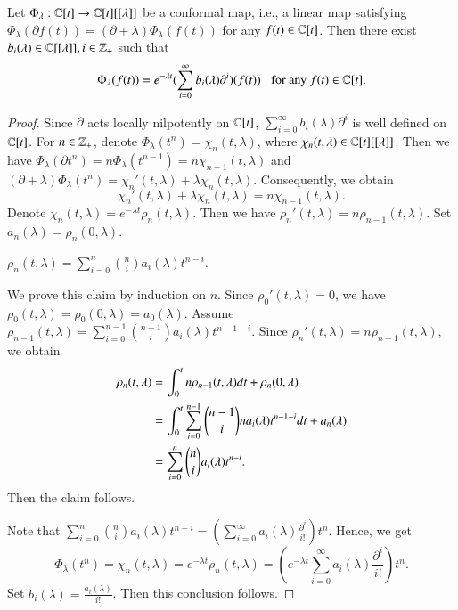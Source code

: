 \documentclass[12pt]{amsart}
\begin{document}
\begin{lem}\label{lem-conf}
Let $\Phi_\lambda: \mathbb{C}[t]\rightarrow \mathbb{C}[t][[\lambda]]$ be a conformal map, i.e., a linear
map satisfying $\Phi_\lambda(\partial f(t))=(\partial+\lambda)\Phi_\lambda(f(t))$ for any $f(t)\in\mathbb{C}[t]$.
Then there exist $b_i(\lambda)\in\mathbb{C}[[\lambda]],i\in\mathbb{Z}_+$ such that $$\Phi_\lambda(f(t))=e^{-\lambda t}(\sum_{i=0}^\infty b_i(\lambda)\partial^i)(f(t))\;\;\;\text{for any $f(t)\in\mathbb{C}[t]$}.$$
\end{lem}
\begin{proof}
Since $\partial$ acts locally nilpotently on $\mathbb{C}[t]$, $\sum_{i=0}^\infty b_i(\lambda)\partial^i$ is well defined on $\mathbb{C}[t]$.
For $n\in \mathbb{Z}_+$, denote $\Phi_\lambda(t^n)=\chi_n(t,\lambda)$, where $\chi_n(t,\lambda)\in\mathbb{C}[t][[\lambda]]$.
Then we have $\Phi_\lambda(\partial t^n)=n\Phi_\lambda(t^{n-1})=n\chi_{n-1}(t,\lambda)$ and $(\partial+\lambda)\Phi_\lambda(t^n)=\chi_n'(t,\lambda)+\lambda \chi_n(t,\lambda)$. Consequently, we obtain
$$\chi_n'(t,\lambda)+\lambda \chi_n(t,\lambda)=n\chi_{n-1}(t,\lambda).$$
Denote $\chi_n(t,\lambda)=e^{-\lambda t}\rho_n(t,\lambda)$. Then we have
$\rho_n'(t,\lambda)=n\rho_{n-1}(t,\lambda)$. Set $a_n(\lambda)=\rho_n(0,\lambda)$.
\begin{cla}
$\rho_n(t,\lambda)=\sum_{i=0}^n \binom{n}{i}a_i(\lambda)t^{n-i}$.
\end{cla}
We prove this claim by induction on $n$.
Since $\rho_0'(t,\lambda)=0$, we have $\rho_0(t,\lambda)=\rho_0(0,\lambda)=a_0(\lambda)$. Assume
$\rho_{n-1}(t,\lambda)=\sum_{i=0}^{n-1} \binom{n-1}{i}a_i(\lambda)t^{n-1-i}$.
Since $\rho_n'(t,\lambda)=n\rho_{n-1}(t,\lambda)$, we obtain
\begin{equation*}
\aligned
\rho_n(t,\lambda)&=\int_{0}^{t}n\rho_{n-1}(t,\lambda) dt+\rho_n(0,\lambda)\\
&=\int_{0}^{t}\sum_{i=0}^{n-1}\binom{n-1}{i}na_i(\lambda)t^{n-1-i}dt+a_n(\lambda)\\
&=\sum_{i=0}^n \binom{n}{i}a_i(\lambda)t^{n-i}.
\endaligned
\end{equation*}
Then the claim follows.

Note that $\sum_{i=0}^n \binom{n}{i}a_i(\lambda)t^{n-i}=(\sum_{i=0}^\infty a_i(\lambda)\frac{\partial^i}{i!})t^n$. Hence, we get
$$\Phi_\lambda(t^n)=\chi_n(t,\lambda)=e^{-\lambda t}\rho_n(t,\lambda)=(e^{-\lambda t}\sum_{i=0}^\infty a_i(\lambda)\frac{\partial^i}{i!})t^n.$$
Set $b_i(\lambda)=\frac{a_i(\lambda)}{i!}$.
Then this conclusion follows.
\end{proof}
\end{document}
